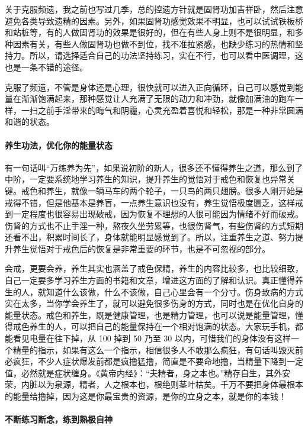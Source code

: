 关于克服频遗，我之前也写过几季，总的控遗方针就是固肾功加吉祥卧，然后注意避免各类导致遗精的因素。另外，如果固肾功感觉效果不明显，也可以试试铁板桥和站桩等，有的人做固肾功的效果是很好的，但在有些人身上则不是很明显，和多种因素有关，有些人做固肾功也做不到位，找不准拉紧感，也缺少练习的热情和坚持力。所以，请选择适合自己的功法坚持练习，实在不行，也可以看中医调理，这也是一条不错的途径。

克服了频遗，不管是身体还是心理，很快就可以进入正向循环，自己可以感觉到能量在渐渐饱满起来，那种感觉让人充满了无限的动力和冲劲，就像加满油的跑车一样，一扫之前手淫带来的晦气和阴霾，心灵充盈着喜悦和轻松，那是一种非常圆满和谐的状态。

\paragraph{养生功法，优化你的能量状态}

有一句话叫“万练养为先”，如果说初阶的新人，很多还不懂得养生之道，那么到了中阶，一定要系统地学习养生的知识，提升养生的觉悟对于戒色和恢复也异常关键。戒色和养生，就像一辆马车的两个轮子，一只鸟的两只翅膀。很多人刚开始是戒得不错，但是他基本是养盲，一点养生意识也没有，养生觉悟极度匮乏，这样戒到一定程度也很容易出现破戒，因为恢复不理想的人很可能因为情绪不好而破戒。伤肾的方式也不止手淫一种，熬夜久坐劳累等，也很伤肾气，有些伤肾的方式短期还看不出，积累时间长了，身体就能明显感觉到了。所以，注重养生之道、努力提升养生觉悟对于戒色后的恢复是非常重要的环节，也是不可忽视的部分。

会戒，更要会养，养生其实也涵盖了戒色保精，养生的内容比较多，也比较细致，自己一定要多学习养生方面的书籍和文章，增进这方面的了解和认识。真正懂得养生的人，就知道什么该做，什么不该做，自己心里会有一个分寸。伤身致病的方式实在太多，当你学会养生了，就可以避免很多伤身的方式，同时也是在优化自身的能量状态。戒色和养生，既是健康管理，也是精力管理，也可以说是能量管理，懂得戒色养生的人，可以把自己的能量保持在一个相对饱满的状态。大家玩手机，都能看见电量在往下掉，从 100 掉到 50 乃至 30 以内，可惜我们的身体没有这样一个精量的指示，如果有这么一个指示，相信很多人不敢那么疯狂，有句话叫毁灭前必疯狂，不少人症状爆发前都是疯撸猛撸，简直是不要命地撸，当精量下降到一定值，必然就是症状缠身。《黄帝内经》：“夫精者，身之本也。”精存自生，其外安荣，内脏以为泉源，精者，人之根本也，根绝则茎叶枯矣。千万不要把身体最根本的能量给撸掉，因为这是你最宝贵的资源，是你的立身之本，就是你的本钱！

\paragraph{不断练习断念，练到熟极自神}

